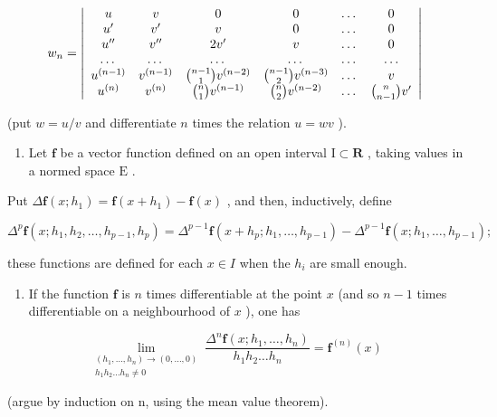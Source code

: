 \[
w _ {n} = \left| \begin{array}{c c c c c c} u & v & 0 & 0 & \dots & 0 \\ u ^ {\prime} & v ^ {\prime} & v & 0 & \dots & 0 \\ u ^ {\prime \prime} & v ^ {\prime \prime} & 2 v ^ {\prime} & v & \dots & 0 \\ \dots & \dots & \dots & \dots & \dots & \dots \\ u ^ {(n - 1)} & v ^ {(n - 1)} & \binom {n - 1} {1} v ^ {(n - 2)} & \binom {n - 1} {2} v ^ {(n - 3)} & \dots & v \\ u ^ {(n)} & v ^ {(n)} & \binom {n} {1} v ^ {(n - 1)} & \binom {n} {2} v ^ {(n - 2)} & \dots & \binom {n} {n - 1} v ^ {\prime} \end{array} \right|
\]

(put \(w = u / v\) and differentiate \(n\) times the relation \(u = wv\) ).

\begin{enumerate}
\def\labelenumi{\arabic{enumi})}
\setcounter{enumi}{5}
\tightlist
\item
  Let \(\mathbf{f}\) be a vector function defined on an open interval \(\mathrm{I} \subset \mathbf{R}\) , taking values in a normed space \(\mathrm{E}\) .
\end{enumerate}

Put \(\Delta \mathbf{f}(x; h_1) = \mathbf{f}(x + h_1) - \mathbf{f}(x)\) , and then, inductively, define

\[
\Delta^ {p} \mathbf {f} (x; h _ {1}, h _ {2}, \dots , h _ {p - 1}, h _ {p}) = \Delta^ {p - 1} \mathbf {f} (x + h _ {p}; h _ {1}, \dots , h _ {p - 1}) - \Delta^ {p - 1} \mathbf {f} (x; h _ {1}, \dots , h _ {p - 1});
\]

these functions are defined for each \(x \in I\) when the \(h_{i}\) are small enough.

\begin{enumerate}
\def\labelenumi{\alph{enumi})}
\tightlist
\item
  If the function \(\mathbf{f}\) is \(n\) times differentiable at the point \(x\) (and so \(n - 1\) times differentiable on a neighbourhood of \(x\) ), one has
\end{enumerate}

\[
\lim_{\substack{(h_{1},\ldots ,h_{n})\to (0,\ldots ,0)\\ h_{1}h_{2}\ldots h_{n}\neq 0}}\frac{\varDelta^{n}\mathbf{f}(x;h_{1},\ldots,h_{n})}{h_{1}h_{2}\ldots h_{n}} = \mathbf{f}^{(n)}(x)
\]

(argue by induction on n, using the mean value theorem).

